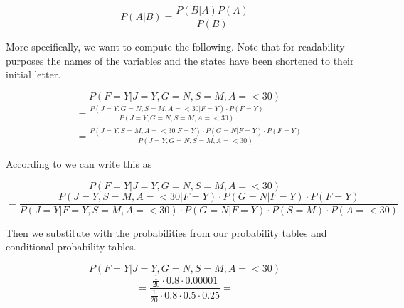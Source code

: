 \begin{equation}
P(A|B) = \frac{P(B|A)P(A)}{P(B)}
\end{equation}

More specifically, we want to compute the following. Note that for readability purposes the names of the variables and the states have been shortened to their initial letter.

\begin{equation*}
P(F=Y|J = Y, G = N, S = M, A = < 30)
\end{equation*}
\begin{equation*}
\begin{split}
&= \frac{P(J = Y, G = N, S = M, A = < 30|F=Y) \cdot P(F=Y)}{P(J = Y, G = N, S = M, A = < 30)} \\
&= \frac{P(J = Y, S = M, A = < 30|F=Y) \cdot P(G=N|F=Y) \cdot P(F=Y)}{P(J = Y, G = N, S = M, A = < 30)}
\end{split}
\end{equation*}

According to  we can write this as

\begin{equation*}
P(F=Y|J = Y, G = N, S = M, A = < 30)
\end{equation*}
\begin{equation*}
= \frac{P(J = Y, S = M, A = < 30|F=Y) \cdot P(G=N|F=Y) \cdot P(F=Y)}{P(J=Y|F=Y,S=M,A=<30) \cdot P(G=N|F=Y) \cdot P(S=M) \cdot P(A=<30)}
\end{equation*}

Then we substitute with the probabilities from our probability tables and conditional probability tables.

\begin{equation*}
P(F=Y|J = Y, G = N, S = M, A = < 30)
\end{equation*}
\begin{equation*}
= \frac{\frac{1}{20} \cdot 0.8 \cdot 0.00001}{\frac{1}{20} \cdot 0.8 \cdot 0.5 \cdot 0.25} =
\end{equation*}
